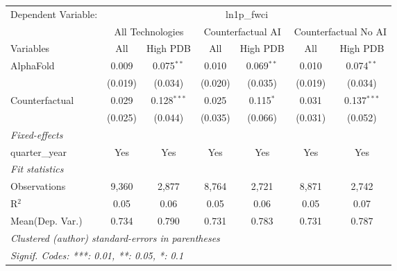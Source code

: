 \begingroup
\centering
\begin{tabular}{lcccccc}
   \tabularnewline \midrule \midrule
   Dependent Variable: & \multicolumn{6}{c}{ln1p\_fwci}\\
 & \multicolumn{2}{c}{All Technologies} & \multicolumn{2}{c}{Counterfactual AI} & \multicolumn{2}{c}{Counterfactual No AI} \\
\cmidrule(lr){1-1}\cmidrule(lr){2-3} \cmidrule(lr){4-5} \cmidrule(lr){6-7}
Variables & \multicolumn{1}{c}{All} & \multicolumn{1}{c}{High PDB} & \multicolumn{1}{c}{All} & \multicolumn{1}{c}{High PDB} & \multicolumn{1}{c}{All} & \multicolumn{1}{c}{High PDB} \\
\cmidrule(lr){1-1}\cmidrule(lr){2-2} \cmidrule(lr){3-3} \cmidrule(lr){4-4} \cmidrule(lr){5-5} \cmidrule(lr){6-6} \cmidrule(lr){7-7}
   AlphaFold      & 0.009   & 0.075$^{**}$  & 0.010   & 0.069$^{**}$ & 0.010   & 0.074$^{**}$\\   
                  & (0.019) & (0.034)       & (0.020) & (0.035)      & (0.019) & (0.034)\\   
   Counterfactual & 0.029   & 0.128$^{***}$ & 0.025   & 0.115$^{*}$  & 0.031   & 0.137$^{***}$\\   
                  & (0.025) & (0.044)       & (0.035) & (0.066)      & (0.031) & (0.052)\\   
   \midrule
   \emph{Fixed-effects}\\
   quarter\_year  & Yes     & Yes           & Yes     & Yes          & Yes     & Yes\\  
   \midrule
   \emph{Fit statistics}\\
   Observations   & 9,360   & 2,877         & 8,764   & 2,721        & 8,871   & 2,742\\  
   R$^2$          & 0.05    & 0.06          & 0.05    & 0.06         & 0.05    & 0.07\\  
Mean(Dep. Var.) & 0.734 & 0.790 & 0.731 & 0.783 & 0.731 & 0.787 \\
   \midrule \midrule
   \multicolumn{7}{l}{\emph{Clustered (author) standard-errors in parentheses}}\\
   \multicolumn{7}{l}{\emph{Signif. Codes: ***: 0.01, **: 0.05, *: 0.1}}\\
\end{tabular}
\par\endgroup
